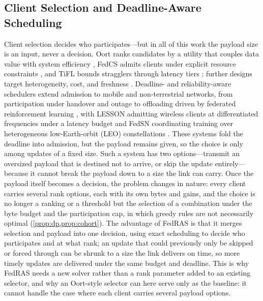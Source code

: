 \documentclass[a4paper,fleqn]{cas-dc}
\begin{document}
\subsection{Client Selection and Deadline-Aware Scheduling}
\label{sec:rwselect}
Client selection decides who participates---but in all of this work the payload size is an input, never a decision. Oort ranks candidates by a utility that couples data value with system efficiency \cite{oort2021oort}, FedCS admits clients under explicit resource constraints \cite{nishio2019fedcs}, and TiFL bounds stragglers through latency tiers \cite{chai2020tifl}; further designs target heterogeneity, cost, and freshness \cite{chen2024clientselection,dong2024aoi,luo2021costeffective}. Deadline- and reliability-aware schedulers extend admission to mobile and non-terrestrial networks, from participation under handover and outage \cite{razmi2022ground,tang2023flsagin,ribero2023intermittent,han2024orchestrating} to offloading driven by federated reinforcement learning \cite{qin2024dfrl}, with LESSON admitting wireless clients at differentiated frequencies under a latency budget \cite{yu2023lesson} and FedSN coordinating training over heterogeneous low-Earth-orbit (LEO) constellations \cite{lin2025fedsn}. These systems fold the deadline into admission, but the payload remains given, so the choice is only among updates of a fixed size. Such a system has two options---transmit an oversized payload that is destined not to arrive, or skip the update entirely---because it cannot break the payload down to a size the link can carry. Once the payload itself becomes a decision, the problem changes in nature: every client carries several rank options, each with its own bytes and gains, and the choice is no longer a ranking or a threshold but the selection of a combination under the byte budget and the participation cap, in which greedy rules are not necessarily optimal (\cref{prop:dp,prop:cohort}). The advantage of FedRAS is that it merges selection and payload into one decision, using exact scheduling to decide who participates and at what rank; an update that could previously only be skipped or forced through can be shrunk to a size the link delivers on time, so more timely updates are delivered under the same budget and deadline. This is why FedRAS needs a new solver rather than a rank parameter added to an existing selector, and why an Oort-style selector can here serve only as the baseline: it cannot handle the case where each client carries several payload options.
\end{document}
